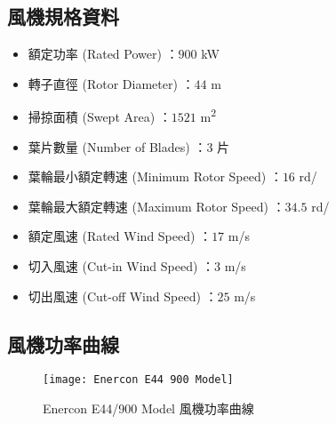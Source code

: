 \subsection*{風機規格資料}

\begin{itemize}
  \item 額定功率 (Rated Power) ：$900$ \si{\kW}
  \item 轉子直徑 (Rotor Diameter) ：$44$ \si{\meter}
  \item 掃掠面積 (Swept Area) ：$1521$ \si{\meter\squared}
  \item 葉片數量 (Number of Blades) ：$3$ 片
  \item 葉輪最小額定轉速 (Minimum Rotor Speed) ：$16$ \si{rd}/\si{\min}
  \item 葉輪最大額定轉速 (Maximum Rotor Speed) ：$34.5$ \si{rd}/\si{\min}
  \item 額定風速 (Rated Wind Speed) ：$17$ \si{m}/\si{s}
  \item 切入風速 (Cut-in Wind Speed) ：$3$ \si{m}/\si{s}
  \item 切出風速 (Cut-off Wind Speed) ：$25$ \si{m}/\si{s}
\end{itemize}

\subsection*{風機功率曲線}

\begin{figure}[htbp]
  \centering
  \texttt{[image: Enercon E44 900 Model]}
  \caption{Enercon E44/900 Model 風機功率曲線}
  \label{figure: Enercon E44/900 Model}
\end{figure}
